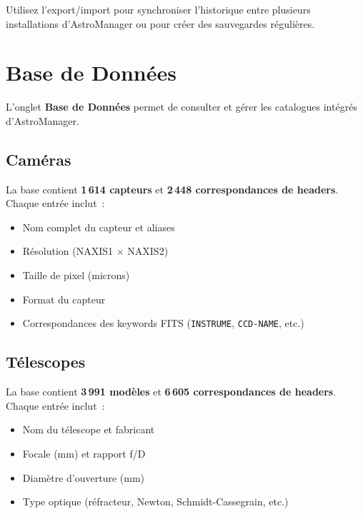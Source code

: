 \documentclass[a4paper,11pt]{article}
\begin{document}
\begin{tipbox}
Utilisez l'export/import pour synchroniser l'historique entre plusieurs installations d'AstroManager ou pour cr\'{e}er des sauvegardes r\'{e}guli\`{e}res.
\end{tipbox}


\section{Base de Donn\'{e}es}
\label{sec:database}

L'onglet \textbf{Base de Donn\'{e}es} permet de consulter et g\'{e}rer les catalogues int\'{e}gr\'{e}s d'AstroManager.

\subsection{Cam\'{e}ras}

La base contient \textbf{1\,614 capteurs} et \textbf{2\,448 correspondances de headers}. Chaque entr\'{e}e inclut~:

\begin{itemize}
    \item Nom complet du capteur et aliases
    \item R\'{e}solution (NAXIS1 $\times$ NAXIS2)
    \item Taille de pixel (microns)
    \item Format du capteur
    \item Correspondances des keywords FITS (\texttt{INSTRUME}, \texttt{CCD-NAME}, etc.)
\end{itemize}

\subsection{T\'{e}lescopes}

La base contient \textbf{3\,991 mod\`{e}les} et \textbf{6\,605 correspondances de headers}. Chaque entr\'{e}e inclut~:

\begin{itemize}
    \item Nom du t\'{e}lescope et fabricant
    \item Focale (mm) et rapport f/D
    \item Diam\`{e}tre d'ouverture (mm)
    \item Type optique (r\'{e}fracteur, Newton, Schmidt-Cassegrain, etc.)
\end{itemize}
\end{document}
